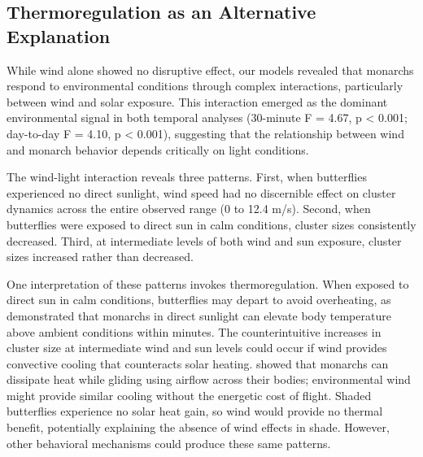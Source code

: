 \subsection{Thermoregulation as an Alternative Explanation}

While wind alone showed no disruptive effect, our models revealed that monarchs respond to environmental conditions through complex interactions, particularly between wind and solar exposure. This interaction emerged as the dominant environmental signal in both temporal analyses (30-minute F = 4.67, p < 0.001; day-to-day F = 4.10, p < 0.001), suggesting that the relationship between wind and monarch behavior depends critically on light conditions.

The wind-light interaction reveals three patterns. First, when butterflies experienced no direct sunlight, wind speed had no discernible effect on cluster dynamics across the entire observed range (0 to 12.4 m/s). Second, when butterflies were exposed to direct sun in calm conditions, cluster sizes consistently decreased. Third, at intermediate levels of both wind and sun exposure, cluster sizes increased rather than decreased.

One interpretation of these patterns invokes thermoregulation. When exposed to direct sun in calm conditions, butterflies may depart to avoid overheating, as \textcite{mastersMonarchButterflyDanaus1988} demonstrated that monarchs in direct sunlight can elevate body temperature above ambient conditions within minutes. The counterintuitive increases in cluster size at intermediate wind and sun levels could occur if wind provides convective cooling that counteracts solar heating. \textcite{mastersMonarchButterflyDanaus1988} showed that monarchs can dissipate heat while gliding using airflow across their bodies; environmental wind might provide similar cooling without the energetic cost of flight. Shaded butterflies experience no solar heat gain, so wind would provide no thermal benefit, potentially explaining the absence of wind effects in shade. However, other behavioral mechanisms could produce these same patterns.

